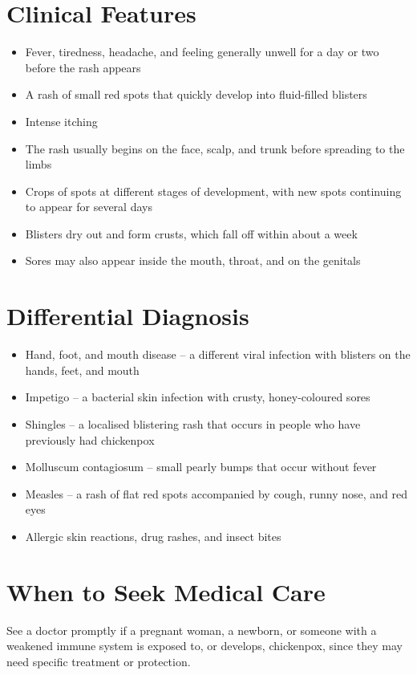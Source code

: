 \section*{Clinical Features}
\begin{itemize}
    \item Fever, tiredness, headache, and feeling generally unwell for a day or two before the rash appears
    \item A rash of small red spots that quickly develop into fluid-filled blisters
    \item Intense itching
    \item The rash usually begins on the face, scalp, and trunk before spreading to the limbs
    \item Crops of spots at different stages of development, with new spots continuing to appear for several days
    \item Blisters dry out and form crusts, which fall off within about a week
    \item Sores may also appear inside the mouth, throat, and on the genitals
\end{itemize}

\section*{Differential Diagnosis}
\begin{itemize}
    \item Hand, foot, and mouth disease -- a different viral infection with blisters on the hands, feet, and mouth
    \item Impetigo -- a bacterial skin infection with crusty, honey-coloured sores
    \item Shingles -- a localised blistering rash that occurs in people who have previously had chickenpox
    \item Molluscum contagiosum -- small pearly bumps that occur without fever
    \item Measles -- a rash of flat red spots accompanied by cough, runny nose, and red eyes
    \item Allergic skin reactions, drug rashes, and insect bites
\end{itemize}

\section*{When to Seek Medical Care}
See a doctor promptly if a pregnant woman, a newborn, or someone with a weakened immune system is exposed to, or develops, chickenpox, since they may need specific treatment or protection.

